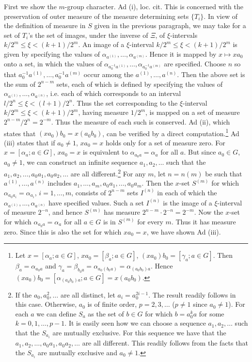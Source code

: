 \documentclass[b5paper,twoside]{article}
\theoremstyle{mvnplain}
\def\mathfrak#1{#1}%
\begin{document}
First we show the \(m\)-group character. Ad (i), loc. cit. This is concerned
with the preservation of outer measure of the measure determining sets
\(\{T_i\}\). In view of the definition of measure in \(S\) given in the
previous paragraph, we may take for a set of \(T_i\)'s the set of images, under
the inverse of \(\Xi\), of \(\xi\)-intervals
\(k/2^m\leq\xi<(k+1)/2^m\). An image of a \(\xi\)-interval
\(k/2^m\leq\xi<(k+1)/2^m\) is given by specifying the values of
\(\alpha_{a^{(1)}},\ldots,\alpha_{a^{(m)}}\). Hence it is mapped by
\(x\mapsto xa_0\) onto a set, in which the values of
\(\alpha_{a_0^{-1}a^{(1)}},\ldots,\alpha_{a_0^{-1}a^{(m)}}\) are specified.
Choose \(n\) so that
\(a_0^{-1}a^{(1)},\ldots,a_0^{-1}a^{(m)}\) occur among the
\(a^{(1)},\ldots,a^{(n)}\). Then the above set is the sum of \(2^{n-m}\)
sets, each of which is defined by specifying the values of
\(\alpha_{a^{(1)}},\ldots,\alpha_{a^{(n)}}\), i.e. each of which corresponds
to an interval \(l/2^n\leq\xi<(l+1)/2^n\). Thus the set corresponding to
the \(\xi\)-interval \(k/2^m\leq\xi<(k+1)/2^m\), having measure
\(1/2^m\), is mapped on a set of measure
\(2^{n-m}/2^n=2^{-m}\). Thus the measure of each such is conserved. Ad (ii),
which states that \((xa_0)b_0=x(a_0b_0)\), can be verified by a direct
computation.\footnote{Let \(x=[\alpha_a;a\in\mathfrak G]\),
\(xa_0=[\beta_a;a\in\mathfrak G]\),
\((xa_0)b_0=[\gamma_a;a\in\mathfrak G]\). Then
\(\beta_a=\alpha_{a_0a}\) and
\(\gamma_a=\beta_{b_0a}=\alpha_{a_0(b_0a)}=\alpha_{(a_0b_0)a}\). Hence
\((xa_0)b_0=[\alpha_{(a_0b_0)a};a\in\mathfrak G]=x(a_0b_0)\).} Ad (iii)
states that if \(a_0\ne1\), \(xa_0=x\) holds only for a set of measure zero.
For \(x=[\alpha_a;a\in\mathfrak G]\), \(xa_0=x\) is equivalent to
\(\alpha_{a_0a}=\alpha_a\) for all \(a\). But since
\(a_0\in\mathfrak G\), \(a_0\ne1\), we can construct an infinite sequence
\(a_1,a_2,\ldots\) such that the
\(a_1,a_2,\ldots,a_0a_1,a_0a_2,\ldots\) are all different.\footnote{\label{fn:60}If the
\(a_0,a_0^2,\ldots\) are all distinct, let
\(a_i=a_0^{2i-1}\). The result
readily follows in this case. Otherwise, \(a_0\) is of finite order,
\(p=2,3,\ldots\) (\(p\ne1\) since \(a_0\ne1\)). For each \(a\) we can
define \(S_a\) as the set of \(b\in\mathfrak G\) for which \(b=a_0^ka\) for
some \(k=0,1,\ldots,p-1\). It is easily seen how we can choose a sequence
\(a_1,a_2,\ldots\) such that the \(S_{a_i}\) are mutually exclusive. For this
sequence we have that the \(a_1,a_2,\ldots,a_0a_1,a_0a_2,\ldots\) are all
different. This readily follows from the facts that the \(S_{a_i}\) are
mutually exclusive and \(a_0\ne1\).} For any \(m\), let \(n=n(m)\) be such
that \(a^{(1)},\ldots,a^{(n)}\) includes
\(a_1,\ldots,a_m,a_0a_1,\ldots,a_0a_m\). Then the \(x\)-set \(S^{(m)}\) for
which \(\alpha_{a_0a_i}=\alpha_{a_i}\), \(i=1,\ldots,m\), consists of
\(2^{n-m}\) sets \(I^{(n)}\) in each of which the
\(\alpha_{a^{(1)}},\ldots,\alpha_{a^{(n)}}\) have specified values. Such a
set \(I^{(n)}\) is the image of a \(\xi\)-interval of measure \(2^{-n}\), and
hence \(S^{(m)}\) has measure \(2^{n-m}\cdot2^{-n}=2^{-m}\). Now the
\(x\)-set for which \(\alpha_{a_0a}=\alpha_a\) for all
\(a\in\mathfrak G\) is in \(S^{(m)}\) for every \(m\). Thus it has measure
zero. Since this is also the set for which \(xa_0=x\), we have shown Ad (iii).
\end{document}
